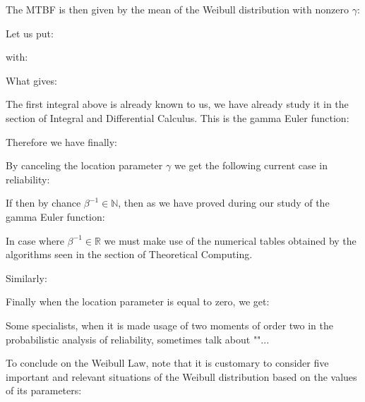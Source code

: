 	The MTBF is then given by the mean of the Weibull distribution with nonzero $\gamma$:
	
	Let us put:
	
	with:
	
	What gives:
	
	The first integral above is already known to us, we have already study it in the section of Integral and Differential Calculus. This is the gamma Euler function:
	
	Therefore we have finally:
	
	By canceling the location parameter $\gamma$ we get the following current case in reliability:
	
	\begin{tcolorbox}[title=Remark,colframe=black,arc=10pt]
	If then by chance $\beta^{-1} \in \mathbb{N}$, then as we have proved during our study of the gamma Euler function:
	
	In case where $\beta^{-1} \in \mathbb{R}$ we must make use of the numerical tables obtained by the algorithms seen in the section of Theoretical Computing.
	\end{tcolorbox}	
	Similarly:
	
	Finally when the location parameter is equal to zero, we get:
	
	\begin{tcolorbox}[title=Remark,colframe=black,arc=10pt]
	Some specialists, when it is made usage of two moments of order two in the probabilistic analysis of reliability, sometimes talk about ""...
	\end{tcolorbox}	
	To conclude on the Weibull Law, note that it is customary to consider five important and relevant situations of the Weibull distribution based on the values of its parameters:
	
